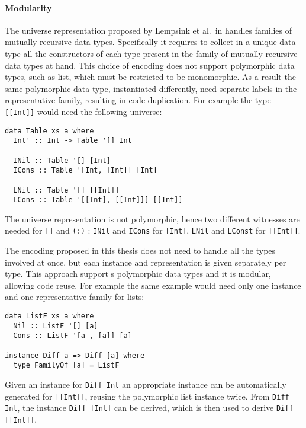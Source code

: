 \documentclass[../Thesis.tex]{subfiles}
\begin{document}
	\paragraph{Modularity}
	The universe representation proposed by Lempsink et al.\ in \cite{Lemp09}
	handles families of mutually recursive data types.
	Specifically it requires to collect in a unique data type all the constructors of
	each type present in the family of mutually recursive data types at hand.
	This choice of encoding does not support polymorphic data types, 
	such as list, which must be 	restricted to be monomorphic. 
	As a result the same polymorphic data type, instantiated differently, need 
	separate labels in the representative family, resulting in code duplication.
	For example the type \texttt{[[Int]]} would need the following
	universe:

\begin{verbatim}
data Table xs a where
  Int' :: Int -> Table '[] Int	

  INil :: Table '[] [Int]
  ICons :: Table '[Int, [Int]] [Int]

  LNil :: Table '[] [[Int]]
  LCons :: Table '[[Int], [[Int]]] [[Int]]	
\end{verbatim}
	The universe representation is not polymorphic, hence
	two different witnesses are needed for \texttt{[]} and \texttt{(:)} : 
	\texttt{INil} and \texttt{ICons} for \texttt{[Int]}, 
	\texttt{LNil} and \texttt{LConst} for \texttt{[[Int]]}.
	
	The encoding proposed in this thesis does not need 
	to handle all the types involved at once, but each instance
	and representation is given separately per type.
	This approach support	s polymorphic data types and it 
	is modular, allowing code reuse.
	For example the same example would need only one
	instance and one representative family for lists:
	
\begin{verbatim}
data ListF xs a where
  Nil :: ListF '[] [a]
  Cons :: ListF '[a , [a]] [a]
	
instance Diff a => Diff [a] where	
  type FamilyOf [a] = ListF
\end{verbatim}
	
	Given an instance for \texttt{Diff Int} an appropriate
	instance can be automatically generated for \texttt{[[Int]]},
	reusing the polymorphic list instance twice.
	From \texttt{Diff Int}, the instance \texttt{Diff [Int]} can be derived,
	which is then used to derive \texttt{Diff [[Int]]}.
	
\end{document}
